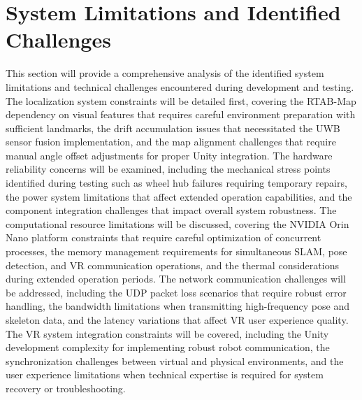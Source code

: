 \section{System Limitations and Identified Challenges}
This section will provide a comprehensive analysis of the identified system limitations and technical challenges encountered during development and testing. The localization system constraints will be detailed first, covering the RTAB-Map dependency on visual features that requires careful environment preparation with sufficient landmarks, the drift accumulation issues that necessitated the UWB sensor fusion implementation, and the map alignment challenges that require manual angle offset adjustments for proper Unity integration. The hardware reliability concerns will be examined, including the mechanical stress points identified during testing such as wheel hub failures requiring temporary repairs, the power system limitations that affect extended operation capabilities, and the component integration challenges that impact overall system robustness. The computational resource limitations will be discussed, covering the NVIDIA Orin Nano platform constraints that require careful optimization of concurrent processes, the memory management requirements for simultaneous SLAM, pose detection, and VR communication operations, and the thermal considerations during extended operation periods. The network communication challenges will be addressed, including the UDP packet loss scenarios that require robust error handling, the bandwidth limitations when transmitting high-frequency pose and skeleton data, and the latency variations that affect VR user experience quality. The VR system integration constraints will be covered, including the Unity development complexity for implementing robust robot communication, the synchronization challenges between virtual and physical environments, and the user experience limitations when technical expertise is required for system recovery or troubleshooting.

